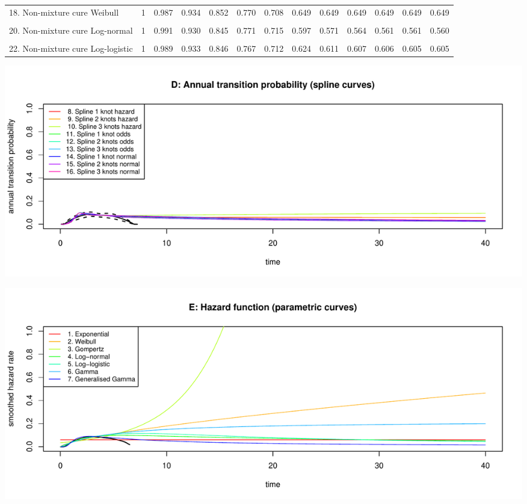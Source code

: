 \documentclass[]{article}
\begin{document}
\begin{table}
{\begin{tabular}[t]{lrrrrrrrrrrrr}
18. Non-mixture cure Weibull & 1 & 0.987 & 0.934 & 0.852 & 0.770 & 0.708 & 0.649 & 0.649 & 0.649 & 0.649 & 0.649 & 0.649\\
\cellcolor{gray!6}{19. Mixture cure Log-normal} & \cellcolor{gray!6}{1} & \cellcolor{gray!6}{0.991} & \cellcolor{gray!6}{0.930} & \cellcolor{gray!6}{0.845} & \cellcolor{gray!6}{0.771} & \cellcolor{gray!6}{0.715} & \cellcolor{gray!6}{0.600} & \cellcolor{gray!6}{0.578} & \cellcolor{gray!6}{0.573} & \cellcolor{gray!6}{0.572} & \cellcolor{gray!6}{0.571} & \cellcolor{gray!6}{0.571}\\
20. Non-mixture cure Log-normal & 1 & 0.991 & 0.930 & 0.845 & 0.771 & 0.715 & 0.597 & 0.571 & 0.564 & 0.561 & 0.561 & 0.560\\
\cellcolor{gray!6}{21. Mixture cure Log-logistic} & \cellcolor{gray!6}{1} & \cellcolor{gray!6}{0.989} & \cellcolor{gray!6}{0.933} & \cellcolor{gray!6}{0.846} & \cellcolor{gray!6}{0.767} & \cellcolor{gray!6}{0.712} & \cellcolor{gray!6}{0.624} & \cellcolor{gray!6}{0.610} & \cellcolor{gray!6}{0.607} & \cellcolor{gray!6}{0.605} & \cellcolor{gray!6}{0.604} & \cellcolor{gray!6}{0.604}\\
22. Non-mixture cure Log-logistic & 1 & 0.989 & 0.933 & 0.846 & 0.767 & 0.712 & 0.624 & 0.611 & 0.607 & 0.606 & 0.605 & 0.605\\
\bottomrule
\end{tabular}}
\end{table}

\begin{flushleft}\includegraphics[height=0.29\textheight]{Images/validate_extrapolation1-4} \end{flushleft}

\begin{flushleft}\includegraphics[height=0.29\textheight]{Images/validate_extrapolation1-5} \end{flushleft}
\end{document}
